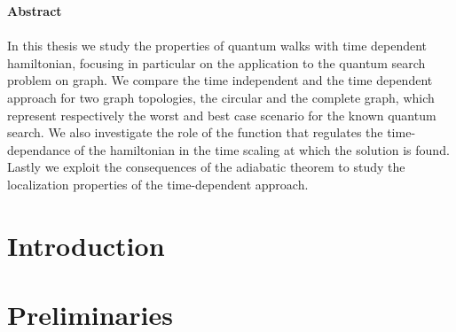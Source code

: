 \documentclass[11pt, twoside]{report}
\begin{document}
\newpage
\thispagestyle{empty}
\textbf{\Large{Abstract}} \\ \\
\noindent
In this thesis we study the properties of quantum walks with time dependent hamiltonian, focusing in particular on the application to the quantum search problem on graph. We compare the time independent and the time dependent approach for two graph topologies, the circular and the complete graph, which represent respectively the worst and best case scenario for the known quantum search. We also investigate the role of the function that regulates the time-dependance of the hamiltonian in the time scaling at which the solution is found. Lastly we exploit the consequences of the adiabatic theorem to study the localization properties of the time-dependent approach.

\newpage
\thispagestyle{empty}
\doublespacing
\tableofcontents
\singlespacing


\newpage
\chapter*{Introduction}


\newpage
\thispagestyle{empty}
\chapter{Preliminaries}
\end{document}

